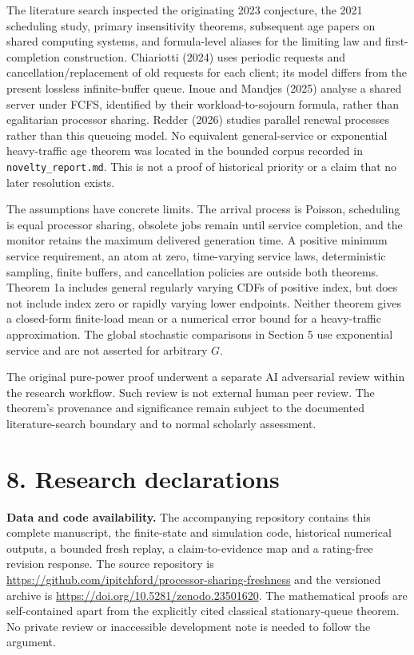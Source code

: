 \documentclass[
  11pt,
  a4paper,
]{scrartcl}
\begin{document}
The literature search inspected the originating 2023 conjecture, the
2021 scheduling study, primary insensitivity theorems, subsequent age
papers on shared computing systems, and formula-level aliases for the
limiting law and first-completion construction. Chiariotti (2024) uses
periodic requests and cancellation/replacement of old requests for each
client; its model differs from the present lossless infinite-buffer
queue. Inoue and Mandjes (2025) analyse a shared server under FCFS,
identified by their workload-to-sojourn formula, rather than egalitarian
processor sharing. Redder (2026) studies parallel renewal processes
rather than this queueing model. No equivalent general-service or
exponential heavy-traffic age theorem was located in the bounded corpus
recorded in \texttt{novelty\_report.md}. This is not a proof of
historical priority or a claim that no later resolution exists.

The assumptions have concrete limits. The arrival process is Poisson,
scheduling is equal processor sharing, obsolete jobs remain until
service completion, and the monitor retains the maximum delivered
generation time. A positive minimum service requirement, an atom at
zero, time-varying service laws, deterministic sampling, finite buffers,
and cancellation policies are outside both theorems. Theorem 1a includes
general regularly varying CDFs of positive index, but does not include
index zero or rapidly varying lower endpoints. Neither theorem gives a
closed-form finite-load mean or a numerical error bound for a
heavy-traffic approximation. The global stochastic comparisons in
Section 5 use exponential service and are not asserted for arbitrary
\(G\).

The original pure-power proof underwent a separate AI adversarial review
within the research workflow. Such review is not external human peer
review. The theorem's provenance and significance remain subject to the
documented literature-search boundary and to normal scholarly
assessment.

\section{8. Research declarations}\label{research-declarations}

\textbf{Data and code availability.} The accompanying repository
contains this complete manuscript, the finite-state and simulation code,
historical numerical outputs, a bounded fresh replay, a
claim-to-evidence map and a rating-free revision response. The source
repository is
\url{https://github.com/ipitchford/processor-sharing-freshness} and the
versioned archive is \url{https://doi.org/10.5281/zenodo.23501620}. The
mathematical proofs are self-contained apart from the explicitly cited
classical stationary-queue theorem. No private review or inaccessible
development note is needed to follow the argument.
\end{document}
